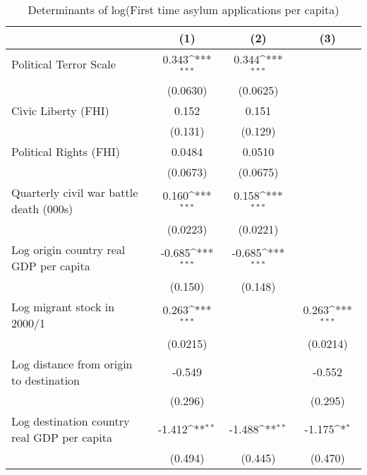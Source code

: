 \begin{table}[htbp]\centering
\def\sym#1{\ifmmode^{#1}\else\(^{#1}\)\fi}
\caption{Determinants of log(First time asylum applications per capita)}
\begin{tabular}{l*{3}{c}}
\hline\hline
                    &\multicolumn{1}{c}{(1)}         &\multicolumn{1}{c}{(2)}         &\multicolumn{1}{c}{(3)}         \\
\hline
Political Terror Scale&       0.343\sym{***}&       0.344\sym{***}&                     \\
                    &    (0.0630)         &    (0.0625)         &                     \\
[1em]
Civic Liberty (FHI) &       0.152         &       0.151         &                     \\
                    &     (0.131)         &     (0.129)         &                     \\
[1em]
Political Rights (FHI)&      0.0484         &      0.0510         &                     \\
                    &    (0.0673)         &    (0.0675)         &                     \\
[1em]
Quarterly civil war battle death (000s)&       0.160\sym{***}&       0.158\sym{***}&                     \\
                    &    (0.0223)         &    (0.0221)         &                     \\
[1em]
Log origin country real GDP per capita&      -0.685\sym{***}&      -0.685\sym{***}&                     \\
                    &     (0.150)         &     (0.148)         &                     \\
[1em]
Log migrant stock in 2000/1&       0.263\sym{***}&                     &       0.263\sym{***}\\
                    &    (0.0215)         &                     &    (0.0214)         \\
[1em]
Log distance from origin to destination&      -0.549         &                     &      -0.552         \\
                    &     (0.296)         &                     &     (0.295)         \\
[1em]
Log destination country real GDP per capita&      -1.412\sym{**} &      -1.488\sym{**} &      -1.175\sym{*}  \\
                    &     (0.494)         &     (0.445)         &     (0.470)         \\

\end{tabular}
\end{table}
